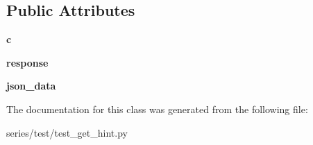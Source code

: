 \subsection*{Public Attributes}
\begin{DoxyCompactItemize}
\item 
\mbox{\label{classseries_1_1test_1_1test__get__hint_1_1_get_hint_test_a6495e53ce53f2cbdd685bef5d1740675}} 
{\bfseries c}
\item 
\mbox{\label{classseries_1_1test_1_1test__get__hint_1_1_get_hint_test_a10420fbf4429e7b2cb0efe2ae0c90be5}} 
{\bfseries response}
\item 
\mbox{\label{classseries_1_1test_1_1test__get__hint_1_1_get_hint_test_a521822334766c4d952ba1bb9919b142f}} 
{\bfseries json\+\_\+data}
\end{DoxyCompactItemize}


The documentation for this class was generated from the following file\+:\begin{DoxyCompactItemize}
\item 
series/test/test\+\_\+get\+\_\+hint.\+py\end{DoxyCompactItemize}

